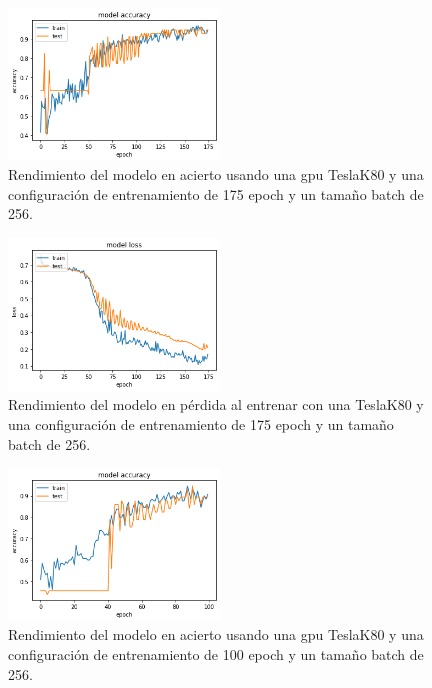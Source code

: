 \begin{figure}
    \centering
    \includegraphics[width=0.5\textwidth]{images/chapter5/batch_256_175_epoch.png}
    \caption{Rendimiento del modelo en acierto usando una gpu TeslaK80 y una configuración de entrenamiento de 175 epoch y un tamaño batch de 256.}
    \label{fig:Resultados de la precisión de entrenamiento con un batch-size de 256 y 175 epochs}
\end{figure}

\begin{figure}
    \centering
    \includegraphics[width=0.5\textwidth]{images/chapter5/batch_256_175_epoch_loss.png}
    \caption{Rendimiento del modelo en pérdida al entrenar con una TeslaK80 y una configuración de entrenamiento de 175 epoch y un tamaño batch de 256.}
    \label{fig:Resultados de loss en el entrenamiento con un batch-size de 256 y 175 epochs}
\end{figure}

\begin{figure}
    \centering
    \includegraphics[width=0.5\textwidth]{images/chapter5/batch_256_100_epoch.png}
    \caption{Rendimiento del modelo en acierto usando una gpu TeslaK80 y una configuración de entrenamiento de 100 epoch y un tamaño batch de 256.}
    \label{fig:Resultados de la precisión de entrenamiento con un batch-size de 256 y 100 epochs}
\end{figure}


